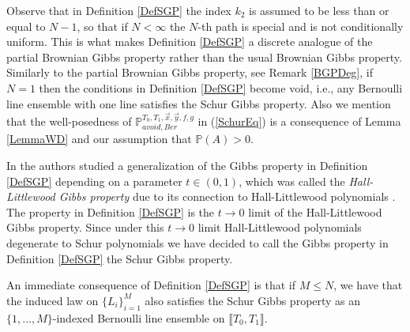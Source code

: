 \begin{remark}\label{RemSGB2} Observe that in Definition \ref{DefSGP} the index $k_2$ is assumed to be less than or equal to $N-1$, so that if $N < \infty$ the $N$-th path is special and is not conditionally uniform. This is what makes Definition \ref{DefSGP} a discrete analogue of the partial Brownian Gibbs property rather than the usual Brownian Gibbs property. Similarly to the partial Brownian Gibbs property, see Remark \ref{BGPDeg}, if $N = 1$ then the conditions in Definition \ref{DefSGP} become void, i.e., any Bernoulli line ensemble with one line satisfies the Schur Gibbs property. Also we mention that the well-posedness of $\mathbb{P}_{avoid, Ber}^{T_0,T_1, \vec{x}, \vec{y}, f, g}$ in (\ref{SchurEq}) is a consequence of Lemma \ref{LemmaWD} and our assumption that $\mathbb{P}(A) > 0$.
\end{remark}

\begin{remark} In \cite{CD} the authors studied a generalization of the Gibbs property in Definition \ref{DefSGP} depending on a parameter $t \in (0,1)$, which was called the {\em Hall-Littlewood Gibbs property} due to its connection to Hall-Littlewood polynomials \cite{Mac}. The property in Definition \ref{DefSGP} is the $t \rightarrow 0$ limit of the Hall-Littlewood Gibbs property. Since under this $t \rightarrow 0$ limit Hall-Littlewood polynomials degenerate to Schur polynomials we have decided to call the Gibbs property in Definition \ref{DefSGP} the Schur Gibbs property.
\end{remark}
\begin{remark} \label{restrict}  An immediate consequence of Definition \ref{DefSGP} is that if $M \leq N$, we have that the induced law on $\{L_i\}_{i = 1}^M$ also satisfies the Schur Gibbs property as an $\{1,\dots,M\}$-indexed Bernoulli line ensemble on $\llbracket T_0, T_1 \rrbracket$.
\end{remark}

